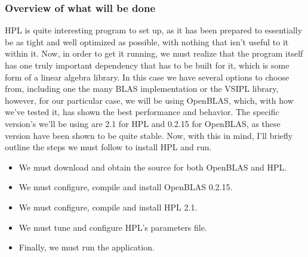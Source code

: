 \documentclass[]{article}
\begin{document}
                                                          \subsubsection{Overview of what will be done}
                                                          HPL is quite interesting program to set up, as it has been prepared to essentially be as tight and well optimized as possible, with 
                                                          nothing that isn't useful to it within it. Now, in order to get it running, we must realize that the program itself has one truly
                                                          important dependency that has to be built for it, which is some form of a linear algebra library. In this case we have several options
                                                          to choose from, including one the many BLAS implementation or the VSIPL library, however, for our particular case, we will be using 
                                                          OpenBLAS, which, with how we've tested it, has shown the best performance and behavior. The specific version's we'll be using are 2.1 
                                                          for HPL and 0.2.15 for OpenBLAS, as these version have been shown to be quite stable. Now, with this in mind, I'll briefly outline
                                                          the steps we must follow to install HPL and run.
                                                          \begin{itemize}
                                                          \item We must download and obtain the source for both OpenBLAS and HPL.
                                                          \item We must configure, compile and install OpenBLAS 0.2.15.
                                                          \item We must configure, compile and install HPL 2.1.
                                                          \item We must tune and configure HPL's parameters file.
                                                          \item Finally, we must run the application.
                                                          \end{itemize}
\end{document}
